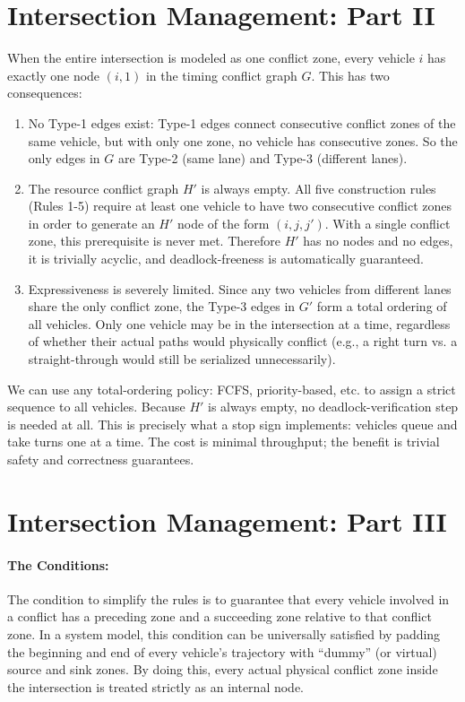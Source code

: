 \documentclass{article}
\begin{document}
\newpage
\section{Intersection Management: Part II}
When the entire intersection is modeled as one conflict zone, every vehicle $i$ has exactly one node $(i,1)$ in the timing conflict graph $G$. This has two consequences:
\begin{enumerate}
    \item No Type-1 edges exist: Type-1 edges connect consecutive conflict zones of the same vehicle, but with only one zone, no vehicle has consecutive zones. So the only edges in $G$ are Type-2 (same lane) and Type-3 (different lanes).
    \item The resource conflict graph $H'$ is always empty. All five construction rules (Rules 1-5) require at least one vehicle to have two consecutive conflict zones in order to generate an $H'$ node of the form $(i,j,j')$. With a single conflict zone, this prerequisite is never met. Therefore $H'$ has no nodes and no edges, it is trivially acyclic, and deadlock-freeness is automatically guaranteed.
    \item Expressiveness is severely limited. Since any two vehicles from different lanes share the only conflict zone, the Type-3 edges in $G'$ form a total ordering of all vehicles. Only one vehicle may be in the intersection at a time, regardless of whether their actual paths would physically conflict (e.g., a right turn vs. a straight-through would still be serialized unnecessarily).
\end{enumerate}

We can use any total-ordering policy: FCFS, priority-based, etc. to assign a strict sequence to all vehicles. Because $H'$ is always empty, no deadlock-verification step is needed at all. This is precisely what a stop sign implements: vehicles queue and take turns one at a time. The cost is minimal throughput; the benefit is trivial safety and correctness guarantees.





\newpage
\section{Intersection Management: Part III}
\paragraph{The Conditions:}
The condition to simplify the rules is to guarantee that every vehicle involved in a conflict has a preceding zone and a succeeding zone relative to that conflict zone. In a system model, this condition can be universally satisfied by padding the beginning and end of every vehicle's trajectory with ``dummy'' (or virtual) source and sink zones. By doing this, every actual physical conflict zone inside the intersection is treated strictly as an internal node.
\end{document}
